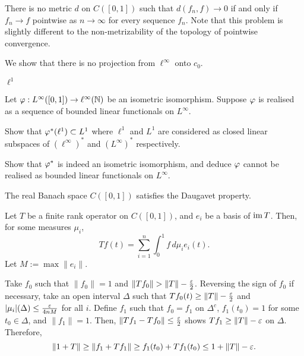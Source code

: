 \documentclass{../../large}
\begin{document}
\begin{prb}
There is no metric $d$ on $C([0,1])$ such that $d(f_n,f)\to0$ if and only if $f_n\to f$ pointwise as $n\to\infty$ for every sequence $f_n$.
Note that this problem is slightly different to the non-metrizability of the topology of pointwise convergence.
\end{prb}

\begin{prb}
We show that there is no projection from $\ell^\infty$ onto $c_0$.
\end{prb}

\begin{prb}
$\ell^1$
\end{prb}

\begin{prb}
Let $\varphi:L^\infty([0,1])\to\ell^\infty(\mathbb{N})$ be an isometric isomorphism.
Suppose $\varphi$ is realised as a sequence of bounded linear functionals on $L^\infty$.
\begin{parts}
\item
Show that $\varphi^*(\ell^1)\subset L^1$ where $\ell^1$ and $L^1$ are considered as closed linear subspaces of $(\ell^\infty)^*$ and $(L^\infty)^*$ respectively.
\item Show that $\varphi^*$ is indeed an isometric isomorphism, and deduce $\varphi$ cannot be realised as bounded linear functionals on $L^\infty$.
\end{parts}
\end{prb}


\begin{prb}
\begin{parts}
\item The real Banach space $C([0,1])$ satisfies the Daugavet property.
\end{parts}
\end{prb}
\begin{pf}
Let $T$ be a finite rank operator on $C([0,1])$, and $e_i$ be a basis of $\operatorname{im} T$.
Then, for some measures $\mu_i$,
\[Tf(t)=\sum_{i=1}^n\int_0^1f\,d\mu_ie_i(t).\]
Let $M:=\max\|e_i\|$.

Take $f_0$ such that $\|f_0\|=1$ and $\|Tf_0\|>\|T\|-\frac\e2$.
Reversing the sign of $f_0$ if necessary, take an open interval $\Delta$ such that $Tf_0(t)\ge\|T\|-\frac{\varepsilon}2$ and $|\mu_i|(\Delta)\le\frac{\varepsilon}{4nM}$ for all $i$.
Define $f_1$ such that $f_0=f_1$ on $\Delta^c$, $f_1(t_0)=1$ for some $t_0\in\Delta$, and $\|f_1\|=1$.
Then, $\|Tf_1-Tf_0\|\le\frac{\varepsilon}2$ shows $Tf_1\ge\|T\|-\varepsilon$ on $\Delta$.
Therefore,
\[\|1+T\|\ge\|f_1+Tf_1\|\ge f_1(t_0)+Tf_1(t_0)\le1+\|T\|-\varepsilon.\]
\end{pf}
\end{document}
